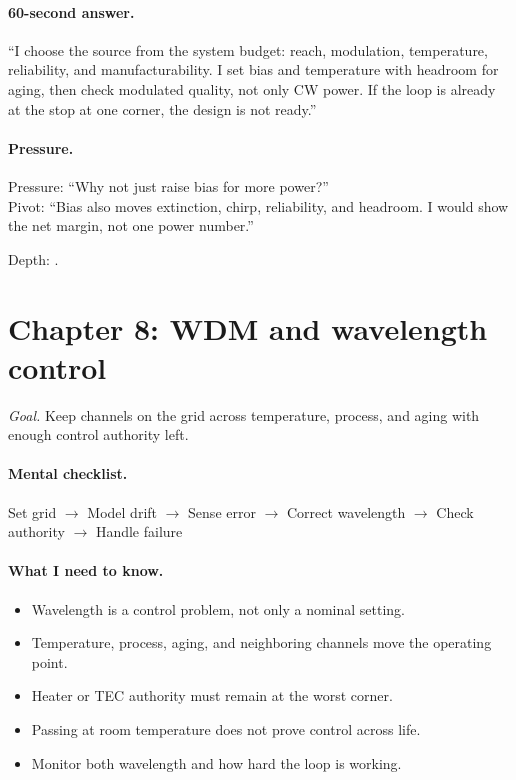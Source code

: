 \paragraph{60-second answer.}
``I choose the source from the system budget: reach, modulation, temperature,
reliability, and manufacturability. I set bias and temperature with headroom for
aging, then check modulated quality, not only CW power. If the loop is already
at the stop at one corner, the design is not ready.''

\paragraph{Pressure.}
Pressure: ``Why not just raise bias for more power?''\\
Pivot: ``Bias also moves extinction, chirp, reliability, and headroom. I would
show the net margin, not one power number.''

\footnotesize Depth: .

\clearpage
\section{Chapter 8: WDM and wavelength control}
\label{sec:cheat-ch6}

\textit{Goal.} Keep channels on the grid across temperature, process, and aging
with enough control authority left.

\paragraph{Mental checklist.}
Set grid $\rightarrow$ Model drift $\rightarrow$ Sense error $\rightarrow$
Correct wavelength $\rightarrow$ Check authority $\rightarrow$ Handle failure

\paragraph{What I need to know.}
\begin{itemize}
\item Wavelength is a control problem, not only a nominal setting.
\item Temperature, process, aging, and neighboring channels move the operating
      point.
\item Heater or TEC authority must remain at the worst corner.
\item Passing at room temperature does not prove control across life.
\item Monitor both wavelength and how hard the loop is working.
\end{itemize}

